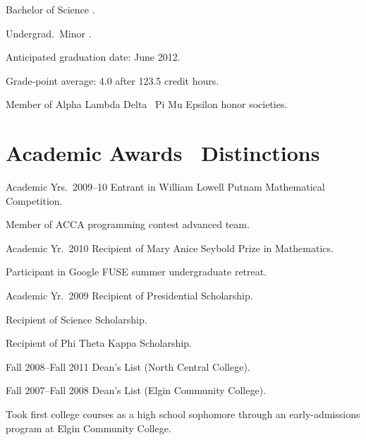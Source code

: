 \documentclass{bcatresume}
\begin{document}
  \maketitle

  \begin{topic}
    \item[Bachelor of Science] .

    \item[Undergrad.\ Minor] .

    \item Anticipated graduation date: June 2012.

    Grade-point average: 4.0 after 123.5 credit hours.

    Member of Alpha Lambda Delta \amp\ Pi Mu Epsilon honor societies.
  \end{topic}

  \section{Academic Awards \amp\ Distinctions}

  \begin{topic}
    \item[Academic Yrs.\ 2009--10] Entrant in William Lowell Putnam Mathematical Competition.

    Member of ACCA programming contest advanced team.

    \item[Academic Yr.\ 2010] Recipient of Mary Anice Seybold Prize in Mathematics.

    Participant in Google FUSE summer undergraduate retreat.

    \item[Academic Yr.\ 2009] Recipient of Presidential Scholarship.

    Recipient of Science Scholarship.

    Recipient of Phi Theta Kappa Scholarship.

    \item[Fall 2008--Fall 2011] Dean's List (North Central College).

    \item[Fall 2007--Fall 2008] Dean's List (Elgin Community College).

    \item Took first college courses as a high school sophomore through an early-admissions program at Elgin Community College.
  \end{topic}
\end{document}
